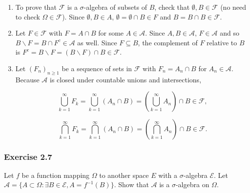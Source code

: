 \documentclass{article}
\begin{document}
\begin{enumerate}
\item To prove that $\mathcal{F}$ is a $\sigma$-algebra of subsets of $B$, check that $\emptyset, B \in \mathcal{F}$ (no need to check $\Omega \in \mathcal{F}$). Since $\emptyset, B \in A$, $\emptyset = \emptyset\cap B \in F$ and $B = B\cap B \in \mathcal{F}$. 

\item Let $F \in \mathcal{F}$ with $F = A\cap B$ for some $A \in \mathcal{A}$. Since $A,B \in \mathcal{A}$, $F \in \mathcal{A}$ and so $B \backslash F = B \cap F^c \in \mathcal{A}$ as well. Since $F \subseteq B$, the complement of $F$ relative to $B$ is $F^c = B \backslash F =  (B\backslash F) \cap B \in \mathcal{F}$.


\item Let $(F_n)_{n\geq 1}$ be a sequence of sets in $\mathcal{F}$ with $F_n = A_n \cap B$ for $A_n \in \mathcal{A}$. Because $\mathcal{A}$ is closed under countable unions and intersections,

$$
\bigcup_{k=1}^\infty F_k = \bigcup_{k=1}^\infty (A_n \cap B) = \left(\bigcup_{k=1}^\infty A_n\right) \cap B \in \mathcal{F},
$$

$$
\bigcap_{k=1}^\infty F_k = \bigcap_{k=1}^\infty (A_n \cap B) = \left(\bigcap_{k=1}^\infty A_n\right) \cap B \in \mathcal{F}.
$$
\end{enumerate}

\subsubsection*{Exercise 2.7}

Let $f$ be a function mapping $\Omega$ to another space $E$ with a $\sigma$-algebra $\mathcal{E}$.
Let $\mathcal{A} = \{A \subset \Omega : \exists B \in \mathcal{E}, A = f^{-1}(B)\}$. Show that $\mathcal{A}$ is a
$\sigma$-algebra on $\Omega$. 
\end{document}
